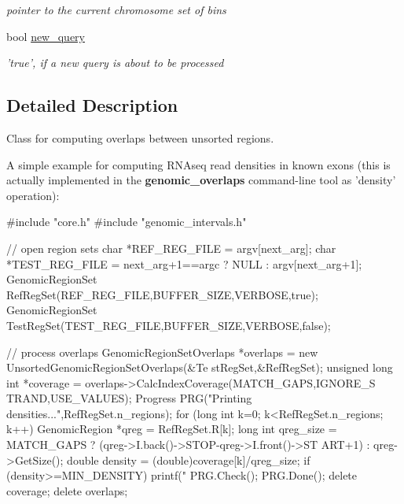 \begin{DoxyCompactItemize}
\begin{DoxyCompactList}\small\item\em pointer to the current chromosome set of bins \end{DoxyCompactList}\item 
\hypertarget{classUnsortedGenomicRegionSetOverlaps_abafc544ce2c677ce071fa4e30ec2ecaf}{
bool \hyperlink{classUnsortedGenomicRegionSetOverlaps_abafc544ce2c677ce071fa4e30ec2ecaf}{new\_\-query}}
\label{classUnsortedGenomicRegionSetOverlaps_abafc544ce2c677ce071fa4e30ec2ecaf}

\begin{DoxyCompactList}\small\item\em 'true', if a new query is about to be processed \end{DoxyCompactList}\end{DoxyCompactItemize}


\subsection{Detailed Description}
Class for computing overlaps between unsorted regions. 

A simple example for computing RNAseq read densities in known exons (this is actually implemented in the {\bfseries genomic\_\-overlaps} command-\/line tool as 'density' operation): 
\begin{DoxyCode}
    #include "core.h"
    #include "genomic_intervals.h"
    
    // open region sets
    char *REF_REG_FILE = argv[next_arg];
    char *TEST_REG_FILE = next_arg+1==argc ? NULL : argv[next_arg+1];
    GenomicRegionSet RefRegSet(REF_REG_FILE,BUFFER_SIZE,VERBOSE,true);
    GenomicRegionSet TestRegSet(TEST_REG_FILE,BUFFER_SIZE,VERBOSE,false);

    // process overlaps
    GenomicRegionSetOverlaps *overlaps = new UnsortedGenomicRegionSetOverlaps(&Te
      stRegSet,&RefRegSet);
    unsigned long int *coverage = overlaps->CalcIndexCoverage(MATCH_GAPS,IGNORE_S
      TRAND,USE_VALUES); 
    Progress PRG("Printing densities...",RefRegSet.n_regions);
    for (long int k=0; k<RefRegSet.n_regions; k++) {
      GenomicRegion *qreg = RefRegSet.R[k];
      long int qreg_size = MATCH_GAPS ? (qreg->I.back()->STOP-qreg->I.front()->ST
      ART+1) : qreg->GetSize();
      double density = (double)coverage[k]/qreg_size;
      if (density>=MIN_DENSITY) printf("%
      PRG.Check();
    }
    PRG.Done();
    delete coverage;
    delete overlaps;
\end{DoxyCode}
 

